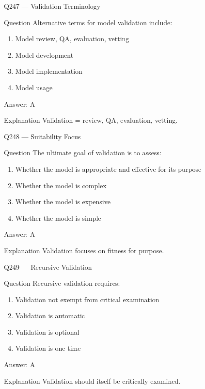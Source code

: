 \documentclass[aspectratio=169,8pt]{beamer}
\begin{document}
\begin{frame}{Q247 --- Validation Terminology}
\begin{block}{Question}
Alternative terms for model validation include:
\begin{enumerate}
\item Model review, QA, evaluation, vetting
\item Model development
\item Model implementation
\item Model usage
\end{enumerate}
\end{block}
\begin{exampleblock}{Answer: A}\end{exampleblock}
\begin{block}{Explanation}
Validation = review, QA, evaluation, vetting.
\end{block}
\end{frame}

\begin{frame}{Q248 --- Suitability Focus}
\begin{block}{Question}
The ultimate goal of validation is to assess:
\begin{enumerate}
\item Whether the model is appropriate and effective for its purpose
\item Whether the model is complex
\item Whether the model is expensive
\item Whether the model is simple
\end{enumerate}
\end{block}
\begin{exampleblock}{Answer: A}\end{exampleblock}
\begin{block}{Explanation}
Validation focuses on fitness for purpose.
\end{block}
\end{frame}

\begin{frame}{Q249 --- Recursive Validation}
\begin{block}{Question}
Recursive validation requires:
\begin{enumerate}
\item Validation not exempt from critical examination
\item Validation is automatic
\item Validation is optional
\item Validation is one-time
\end{enumerate}
\end{block}
\begin{exampleblock}{Answer: A}\end{exampleblock}
\begin{block}{Explanation}
Validation should itself be critically examined.
\end{block}
\end{frame}
\end{document}

